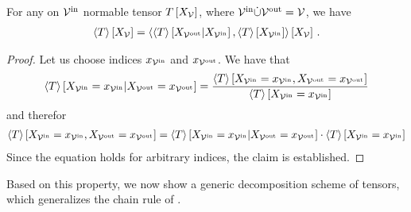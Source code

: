 \begin{theorem}
    \label{the:normationContractionEQ}
    For any on $\mathcal{V}^{\mathrm{in}}$ normable tensor $T\left[X_{\mathcal{V}}\right]$, where $\mathcal{V}^{\mathrm{in}}\dot{\cup}\mathcal{V}^{\mathrm{out}}=\mathcal{V}$, we have
    \begin{align*}
        \left\langle T\right\rangle \left[ X_{\mathcal{V}} \right]
        = \left\langle \left\langle T\right\rangle \left[ X_{\mathcal{V}^{\mathrm{out}}} | X_{\mathcal{V}^{\mathrm{in}}} \right],\left\langle T\right\rangle \left[ X_{\mathcal{V}^{\mathrm{in}}} \right]\right\rangle \left[ X_{\mathcal{V}} \right] \, .
    \end{align*}
\end{theorem}
\begin{proof}
    Let us choose indices $x_{\mathcal{V}^{\mathrm{in}}}$ and $x_{\mathcal{V}^{\mathrm{out}}}$.
    We have that
    \begin{align*}
        \left\langle T\right\rangle \left[ X_{\mathcal{V}^{\mathrm{in}}}=x_{\mathcal{V}^{\mathrm{in}}} | X_{\mathcal{V}^{\mathrm{out}}}=x_{\mathcal{V}^{\mathrm{out}}} \right]
        = \frac{
            \left\langle T\right\rangle \left[ X_{\mathcal{V}^{\mathrm{in}}}=x_{\mathcal{V}^{\mathrm{in}}},X_{\mathcal{V}^{\mathrm{out}}}=x_{\mathcal{V}^{\mathrm{out}}} \right]
        }{
            \left\langle T\right\rangle \left[ X_{\mathcal{V}^{\mathrm{in}}}=x_{\mathcal{V}^{\mathrm{in}}} \right]
        }
    \end{align*}
    and therefor
    \begin{align*}
        \left\langle T\right\rangle \left[ X_{\mathcal{V}^{\mathrm{in}}}=x_{\mathcal{V}^{\mathrm{in}}},X_{\mathcal{V}^{\mathrm{out}}}=x_{\mathcal{V}^{\mathrm{out}}} \right] =
        \left\langle T\right\rangle \left[ X_{\mathcal{V}^{\mathrm{in}}}=x_{\mathcal{V}^{\mathrm{in}}} | X_{\mathcal{V}^{\mathrm{out}}}=x_{\mathcal{V}^{\mathrm{out}}} \right]
        \cdot
        \left\langle T\right\rangle \left[ X_{\mathcal{V}^{\mathrm{in}}}=x_{\mathcal{V}^{\mathrm{in}}} \right]
    \end{align*}
    Since the equation holds for arbitrary indices, the claim is established.
\end{proof}

Based on this property, we now show a generic decomposition scheme of tensors, which generalizes the chain rule of .

